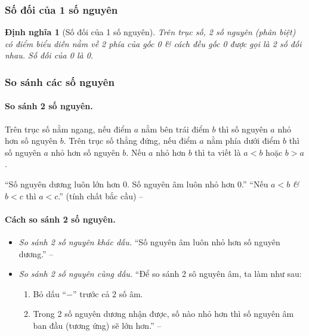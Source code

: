 \documentclass{article}
\numberwithin{equation}{section}
\newtheorem{definition}{Định nghĩa}[section]
\begin{document}
\subsubsection{Số đối của 1 số nguyên}

\begin{definition}[Số đối của 1 số nguyên]
	Trên trục số, 2 số nguyên (phân biệt) có điểm biểu diễn nằm về 2 phía của gốc 0 \textit{\&} cách đều gốc 0 được gọi là \emph{2 số đối nhau}. Số đối của 0 là 0.
\end{definition}

\subsubsection{So sánh các số nguyên}

\paragraph{So sánh 2 số nguyên.}
\noindent\begin{tcolorbox}
	Trên trục số nằm ngang, nếu điểm $a$ nằm bên trái điểm $b$ thì số nguyên $a$ nhỏ hơn số nguyên $b$. Trên trục số thẳng đứng, nếu điểm $a$ nằm phía dưới điểm $b$ thì số nguyên $a$ nhỏ hơn số nguyên $b$. Nếu $a$ nhỏ hơn $b$ thì ta viết là $a < b$ hoặc $b > a$.
\end{tcolorbox}
``Số nguyên dương luôn lớn hơn 0. Số nguyên âm luôn nhỏ hơn 0.'' ``Nếu $a < b$ \textit{\&} $b < c$ thì $a < c$.'' (tính chất bắc cầu) -- \cite[p. 67]{Thai_Anh_Dat_Ha_Loan_Nam_Quang_Toan_6_tap_1}

\paragraph{Cách so sánh 2 số nguyên.}
\begin{itemize}
	\item \textit{So sánh 2 số nguyên khác dấu.} ``Số nguyên âm luôn nhỏ hơn số nguyên dương.'' -- \cite[p. 68]{Thai_Anh_Dat_Ha_Loan_Nam_Quang_Toan_6_tap_1}
	\item \textit{So sánh 2 số nguyên cùng dấu.} ``Để so sánh 2 sô nguyên âm, ta làm như sau:
	\begin{enumerate}
		\item Bỏ dấu ``$-$'' trước cả 2 số âm.
		\item Trong 2 số nguyên dương nhận được, số nào nhỏ hơn thì số nguyên âm ban đầu (tương ứng) sẽ lớn hơn.'' -- \cite[p. 69]{Thai_Anh_Dat_Ha_Loan_Nam_Quang_Toan_6_tap_1}
	\end{enumerate}
\end{itemize}
\end{document}
